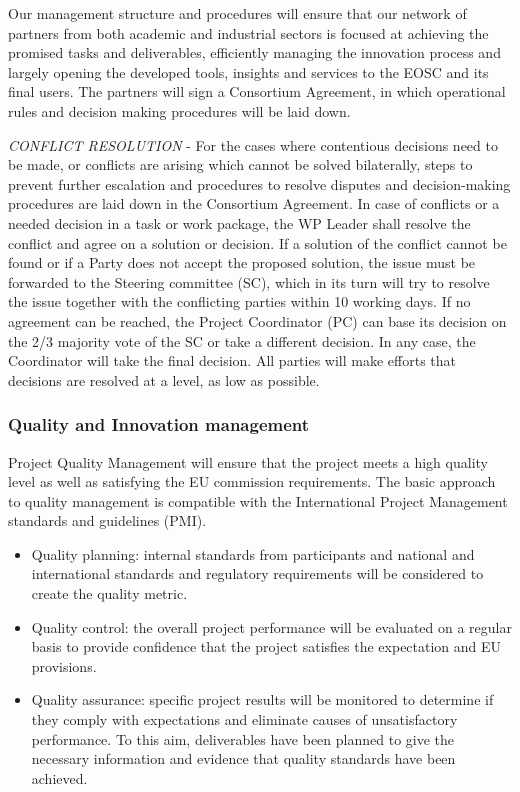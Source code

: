 Our management structure and procedures will ensure that our network
of partners from both academic and industrial sectors is focused at
achieving the promised tasks and deliverables, efficiently managing
the innovation process and largely opening the developed tools,
insights and services to the EOSC and its final users.
The partners will sign a Consortium Agreement, in which operational
rules and decision making procedures will be laid down.

\emph{CONFLICT RESOLUTION} - For the cases where contentious decisions
need to be made, or conflicts are arising which cannot be solved bilaterally,
steps to prevent further escalation and procedures to resolve disputes
and decision-making procedures are laid down in the Consortium Agreement.
In case of conflicts or a needed decision in a task or work package,
the WP Leader shall resolve the conflict and agree on a solution or decision.
If a solution of the conflict cannot be found or if a Party does not accept
the proposed solution, the issue must be forwarded to the Steering committee (SC),
which in its turn will try to resolve the issue together with the conflicting parties
within 10 working days. If no agreement can be reached, the Project Coordinator (PC) can
base its decision on the 2/3 majority vote of the SC or take a different decision.
In any case, the Coordinator will take the final decision. All parties will make
efforts that decisions are resolved at a level, as low as possible.

\subsubsection{Quality and Innovation management}

\TheProject Project Quality Management will ensure that
the project meets a high quality level as well as satisfying the EU commission
requirements. The basic approach to quality management is compatible with the
International Project Management standards and guidelines (PMI).

\begin{itemize}
\item Quality planning: internal standards from participants and national and international standards and
regulatory requirements will be considered to create the quality metric.
\item Quality control: the overall project performance will be evaluated on a regular basis to provide
confidence that the project satisfies the expectation and EU provisions.
\item Quality assurance: specific project results will be monitored to determine if they comply with
expectations and eliminate causes of unsatisfactory performance. To this aim, deliverables have been
planned to give the necessary information and evidence that quality standards have been achieved.
\end{itemize}

